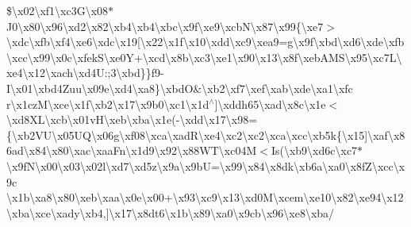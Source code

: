 \begin{DoxyCompactItemize}
\$\textbackslash{}x02\textbackslash{}xf1\textbackslash{}xc3\+G\textbackslash{}x08$\ast$J0\textbackslash{}x80\textbackslash{}x96\textbackslash{}xd2\textbackslash{}x82\textbackslash{}xb4\textbackslash{}xb4\textbackslash{}xbc\textbackslash{}x9f\textbackslash{}xe9\textbackslash{}xcb\+N\textbackslash{}x87\textbackslash{}x99\{\textbackslash{}xe7$>$\textbackslash{}xdc\textbackslash{}xfb\textbackslash{}xf4\textbackslash{}xe6\textbackslash{}xdc\textbackslash{}x19\mbox{[}\textbackslash{}x22\textbackslash{}x1f\textbackslash{}x10\textbackslash{}xdd\textbackslash{}xc9\textbackslash{}xea9=g\textbackslash{}x9f\textbackslash{}xbd\textbackslash{}xd6\textbackslash{}xde\textbackslash{}xfb\textbackslash{}xcc\textbackslash{}x99\textbackslash{}x0c\textbackslash{}xfek\+S\textbackslash{}xe0Y+\textbackslash{}xcd\textbackslash{}x8b\textbackslash{}xc3\textbackslash{}xe1\textbackslash{}x90\textbackslash{}x13\textbackslash{}x8f\textbackslash{}xeb\+A\+M\+S\textbackslash{}x95\textbackslash{}xc7\+L\textbackslash{}xe4\textbackslash{}x12\textbackslash{}xach\textbackslash{}xd4\+U\+:;3\textbackslash{}xbd\}\}f9-\/I\textbackslash{}x01\textbackslash{}xbd4\+Zuu\textbackslash{}x09e\textbackslash{}xd4\textbackslash{}xa8\}\textbackslash{}xbd\textquotesingle{}O\&\textbackslash{}xb2\textbackslash{}xf7\textbackslash{}xef\textbackslash{}xab\textbackslash{}xde\textbackslash{}xa1\textbackslash{}xfc r\textbackslash{}x1cz\+M\textbackslash{}xce\textbackslash{}x1f\textbackslash{}xb2\textbackslash{}x17\textbackslash{}x9b0\textbackslash{}xc1\textbackslash{}x1d$^\wedge$\mbox{]}\textbackslash{}xddh65\textbackslash{}xad\textbackslash{}x8c\textbackslash{}x1e$<$\textbackslash{}xd8\+X\+L\textbackslash{}xcb\textbackslash{}x01v\+H\textbackslash{}xeb\textbackslash{}xba\textbackslash{}x1e(-\/\textbackslash{}xdd\textbackslash{}x17\textbackslash{}x98=\{\textbackslash{}xb2\+V\+U\textbackslash{}x05\+U\+Q\textbackslash{}x06g\textbackslash{}xf08\textbackslash{}xca\textbackslash{}xad\+R\textbackslash{}xe4\textbackslash{}xc2\textbackslash{}xc2\textbackslash{}xca\textbackslash{}xcc\textbackslash{}xb5k\{\textbackslash{}x15\mbox{]}\textbackslash{}xaf\textbackslash{}x86ad\textbackslash{}x84\textbackslash{}x80\textbackslash{}xac\textbackslash{}xaa\+Fn\textbackslash{}x1d9\textbackslash{}x92\textbackslash{}x88\+W\+T\textbackslash{}xc04M$<$Is(\textbackslash{}xb9\textbackslash{}xd6c\textbackslash{}xc7$\ast$\textbackslash{}x9f\textquotesingle{}N\textbackslash{}x00\textbackslash{}x03\textbackslash{}x02l\textbackslash{}xd7\textbackslash{}xd5z\textbackslash{}x9a\textbackslash{}x9bU=\textbackslash{}x99\textbackslash{}x84\textbackslash{}x8d\textquotesingle{}k\textbackslash{}xb6a\textbackslash{}xa0\textbackslash{}x8f\+Z\textbackslash{}xcc\textbackslash{}x9c \textbackslash{}x1b\textbackslash{}xa8\textbackslash{}x80\textbackslash{}xeb\textbackslash{}xaa\textbackslash{}x0e\textbackslash{}x00+\textbackslash{}x93\textbackslash{}xc9\textbackslash{}x13\textbackslash{}xd0\+M\textbackslash{}xcem\textbackslash{}xe10\textbackslash{}x82\textbackslash{}xe94\textbackslash{}x12\textbackslash{}xba\textbackslash{}xce\textbackslash{}xady\textbackslash{}xb4,\mbox{]}\textbackslash{}x17\textbackslash{}x8dt6\textbackslash{}x1b\textbackslash{}x89\textbackslash{}xa0\textbackslash{}x9cb\textbackslash{}x96\textbackslash{}xe8\textbackslash{}xba/ 
\end{DoxyCompactItemize}
